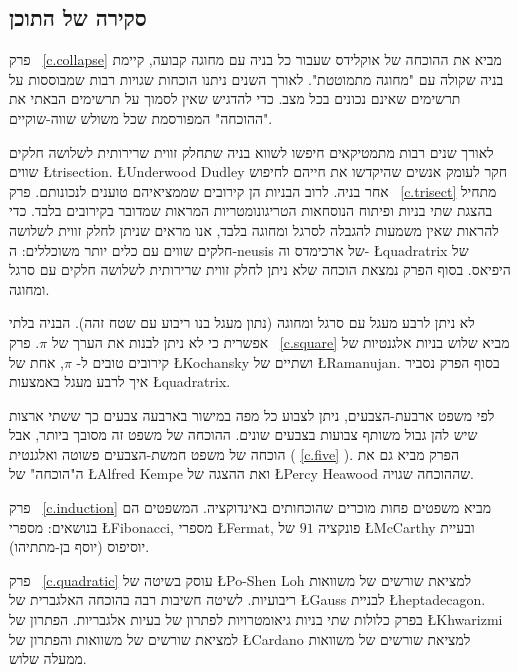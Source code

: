 \subsection*{סקירה של התוכן}


פרק~%
\ref{c.collapse}
מביא את ההוכחה של אוקלידס שעבור כל בניה עם מחוגה קבועה, קיימת בניה שקולה עם "מחוגה מתמוטטת". לאורך השנים ניתנו הוכחות שגויות רבות שמבוססות על תרשימים שאינם נכונים בכל מצב. כדי להדגיש שאין לסמוך על תרשימים הבאתי את "ההוכחה" המפורסמת שכל משולש שווה-שוקיים.

לאורך שנים רבות מתמטיקאים חיפשו לשווא בניה שתחלק זווית שרירותית לשלושה חלקים שווים
\L{trisection}.
\L{Underwood Dudley}
חקר לעומק אנשים שהיקדשו את חייהם לחיפוש אחר בניה. לרוב הבניות הן קירובים שממציאיהם טוענים לנכונותם. פרק~%
\ref{c.trisect}
מתחיל בהצגת שתי בניות ופיתוח הנוסחאות הטריגונומטריות המראות שמדובר בקירובים בלבד. כדי להראות שאין משמעות להגבלה לסרגל ומחוגה בלבד, אנו מראים שניתן לחלק זווית לשלושה חלקים שווים עם כלים יותר משוכללים: ה-neusis של ארכימדס וה-%
\L{quadratrix}
של היפיאס. בסוף הפרק נמצאת הוכחה שלא ניתן לחלק זווית שרירותית לשלושה חלקים עם סרגל ומחוגה.

לא ניתן לרבע מעגל עם סרגל ומחוגה (נתון מעגל בנו ריבוע עם שטח זהה). הבניה בלתי אפשרית כי לא ניתן לבנות את הערך של 
$\pi$.
פרק~%
\ref{c.square}
מביא שלוש בניות אלגנטיות של קירובים טובים ל-%
$\pi$,
אחת של
\L{Kochansky}
ושתיים של
\L{Ramanujan}.
בסוף הפרק נסביר איך לרבע מעגל באמצעות
\L{quadratrix}.


לפי משפט ארבעת-הצבעים, ניתן לצבוע כל מפה במישור בארבעה צבעים כך ששתי ארצות שיש להן גבול משותף צבועות בצבעים שונים. ההוכחה של משפט זה מסובך ביותר, אבל הוכחה של משפט חמשת-הצבעים פשוטה ואלגנטית (%
\ref{c.five}%
). הפרק מביא גם את ה"הוכחה" של 
\L{Alfred Kempe}
ואת ההצגה של 
\L{Percy Heawood}
שההוכחה שגויה.


פרק~%
\ref{c.induction}
מביא משפטים פחות מוכרים שהוכחותים באינדוקציה. המשפטים הם בנושאים: מספרי 
\L{Fibonacci}, 
מספרי
\L{Fermat},
פונקציה 
$91$
של 
\L{McCarthy}
ובעיית יוסיפוס (יוסף בן-מתתיהו).

פרק~%
\ref{c.quadratic}
עוסק בשיטה של
\L{Po-Shen Loh}
למציאת שורשים של משוואות ריבועיות. לשיטה חשיבות רבה בהוכחה האלגברית של
\L{Gauss}
לבניית 
\L{heptadecagon}.
בפרק כלולות שתי בניות גיאומטרויות לפתרון של בעיות אלגבריות. הפתרון של
\L{Khwarizmi}
למציאת שורשים של משוואות והפתרון של
\L{Cardano}
למציאת שורשים של משוואות ממעלה שלוש.

